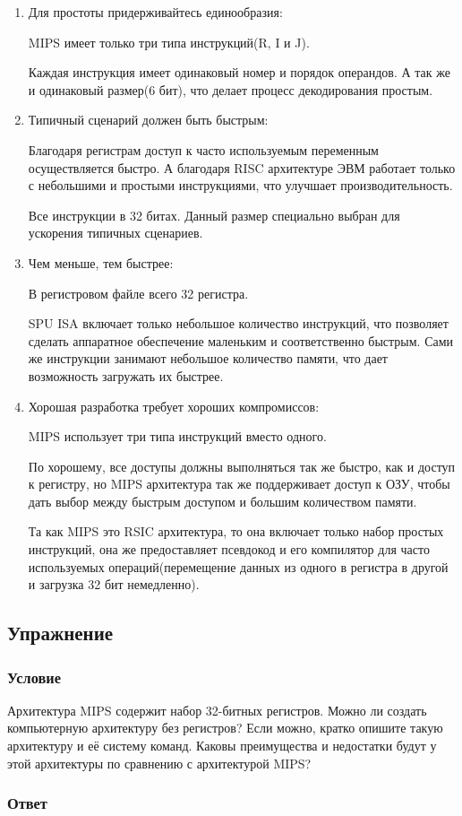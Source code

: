 \documentclass[12pt]{article}
\newenvironment{e}[1][dummy label]{
    \subsection{Упражнение}\label{#1}
    \subsubsection*{Условие}
    }{
    \subsubsection*{Ответ}
}
\begin{document}
    \begin{enumerate}
        \item Для простоты придерживайтесь единообразия:

        MIPS имеет только три типа инструкций(R, I и J).

        Каждая инструкция имеет одинаковый номер и порядок операндов. А так же и одинаковый размер(6 бит), что делает процесс декодирования простым.

        \item Типичный сценарий должен быть быстрым:

        Благодаря регистрам доступ к часто используемым переменным осуществляется быстро. А благодаря RISC архитектуре ЭВМ работает только с небольшими и простыми инструкциями, что улучшает производительность.

        Все инструкции в 32 битах. Данный размер специально выбран для ускорения типичных сценариев.

        \item Чем меньше, тем быстрее:

        В регистровом файле всего 32 регистра.

        SPU ISA включает только небольшое количество инструкций, что позволяет сделать аппаратное обеспечение маленьким и соответственно быстрым. Сами же инструкции занимают небольшое количество памяти, что дает возможность загружать их быстрее.

        \item Хорошая разработка требует хороших компромиссов:

        MIPS использует три типа инструкций вместо одного.

        По хорошему, все доступы должны выполняться так же быстро, как и доступ к регистру, но MIPS архитектура так же поддерживает доступ к ОЗУ, чтобы дать выбор между быстрым доступом и большим количеством памяти.

        Та как MIPS это RSIC архитектура, то она включает только набор простых инструкций, она же предоставляет псевдокод и его компилятор для часто используемых операций(перемещение данных из одного в регистра в другой и загрузка 32 бит немедленно).

    \end{enumerate}

    \newpage

    \begin{e}
        Архитектура MIPS содержит набор 32-битных регистров. Можно ли создать компьютерную архитектуру без регистров? Если можно, кратко опишите такую архитектуру и её систему команд. Каковы преимущества и недостатки будут у этой архитектуры по сравнению с архитектурой MIPS?
    \end{e}
\end{document}
